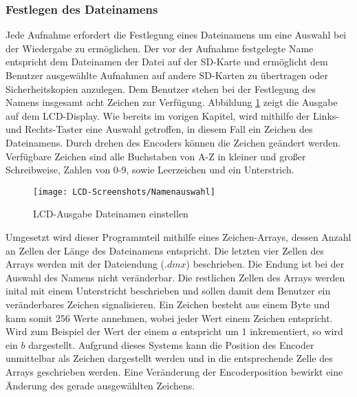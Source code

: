 \subsubsection{Festlegen des Dateinamens}
Jede Aufnahme erfordert die Festlegung eines Dateinamens um eine Auswahl bei der Wiedergabe zu ermöglichen. Der vor der Aufnahme festgelegte Name entspricht dem Dateinamen der Datei auf der SD-Karte und ermöglicht dem Benutzer ausgewählte Aufnahmen auf andere SD-Karten zu übertragen oder Sicherheitskopien anzulegen. Dem Benutzer stehen bei der Festlegung des Namens insgesamt acht Zeichen zur Verfügung. Abbildung \ref{lcd:filename} zeigt die Ausgabe auf dem LCD-Display. Wie bereits im vorigen Kapitel, wird mithilfe der Links- und Rechts-Taster eine Auswahl getroffen, in diesem Fall ein Zeichen des Dateinamens. Durch drehen des Encoders können die Zeichen geändert werden. Verfügbare Zeichen sind alle Buchstaben von A-Z in kleiner und großer Schreibweise, Zahlen von 0-9, sowie Leerzeichen und ein Unterstrich.
\begin{figure}[h]
	\begin{center}
		\texttt{[image: LCD-Screenshots/Namenauswahl]}
		\caption{LCD-Ausgabe Dateinamen einstellen}
		\label{lcd:filename}
	\end{center}
\end{figure}
Umgesetzt wird dieser Programmteil mithilfe eines Zeichen-Arrays, dessen Anzahl an Zellen der Länge des Dateinamens entspricht. Die letzten vier Zellen des Arrays werden mit der Dateiendung ($.dmx$) beschrieben. Die Endung ist bei der Auswahl des Namens nicht veränderbar. Die restlichen Zellen des Arrays werden inital mit einem Unterstricht beschrieben und sollen damit dem Benutzer ein veränderbares Zeichen signalisieren. Ein Zeichen besteht aus einem Byte und kann somit 256 Werte annehmen, wobei jeder Wert einem Zeichen entspricht. Wird zum Beispiel der Wert der einem $a$ entspricht um 1 inkrementiert, so wird ein $b$ dargestellt. Aufgrund dieses Systems kann die Position des Encoder unmittelbar als Zeichen dargestellt werden und in die entsprechende Zelle des Arrays geschrieben werden. Eine Veränderung der Encoderposition bewirkt eine Änderung des gerade ausgewählten Zeichens.

